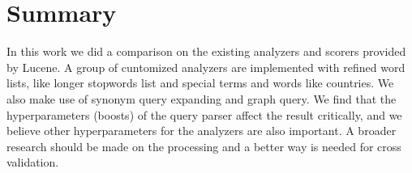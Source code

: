 \section{Summary}

In this work we did a comparison on the existing analyzers and scorers provided by Lucene. A group of cuntomized analyzers are implemented with refined word lists, like longer stopwords list and special terms and words like countries. We also make use of synonym query expanding and graph query. We find that the hyperparameters (boosts) of the query parser affect the result critically, and we believe other hyperparameters for the analyzers are also important. A broader research should be made on the processing and a better way is needed for cross validation.
\vspace{2mm}
